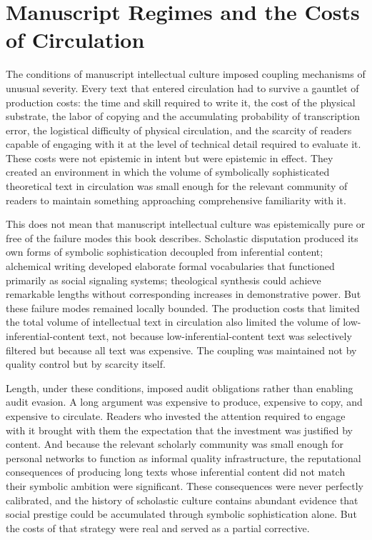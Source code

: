 \documentclass[12pt, openright, twoside]{book}
\begin{document}
\section{Manuscript Regimes and the Costs of Circulation}

The conditions of manuscript intellectual culture imposed coupling mechanisms
of unusual severity. Every text that entered circulation had to survive a
gauntlet of production costs: the time and skill required to write it, the
cost of the physical substrate, the labor of copying and the accumulating
probability of transcription error, the logistical difficulty of physical
circulation, and the scarcity of readers capable of engaging with it at the
level of technical detail required to evaluate it. These costs were not epistemic
in intent but were epistemic in effect. They created an environment in which
the volume of symbolically sophisticated theoretical text in circulation was
small enough for the relevant community of readers to maintain something
approaching comprehensive familiarity with it.

This does not mean that manuscript intellectual culture was epistemically
pure or free of the failure modes this book describes. Scholastic disputation
produced its own forms of symbolic sophistication decoupled from inferential
content; alchemical writing developed elaborate formal vocabularies that
functioned primarily as social signaling systems; theological synthesis could
achieve remarkable lengths without corresponding increases in demonstrative
power. But these failure modes remained locally bounded. The production costs
that limited the total volume of intellectual text in circulation also limited
the volume of low-inferential-content text, not because low-inferential-content
text was selectively filtered but because all text was expensive. The coupling
was maintained not by quality control but by scarcity itself.

Length, under these conditions, imposed audit obligations rather than enabling
audit evasion. A long argument was expensive to produce, expensive to copy,
and expensive to circulate. Readers who invested the attention required to
engage with it brought with them the expectation that the investment was
justified by content. And because the relevant scholarly community was small
enough for personal networks to function as informal quality infrastructure,
the reputational consequences of producing long texts whose inferential
content did not match their symbolic ambition were significant. These
consequences were never perfectly calibrated, and the history of scholastic
culture contains abundant evidence that social prestige could be accumulated
through symbolic sophistication alone. But the costs of that strategy were
real and served as a partial corrective.
\end{document}
